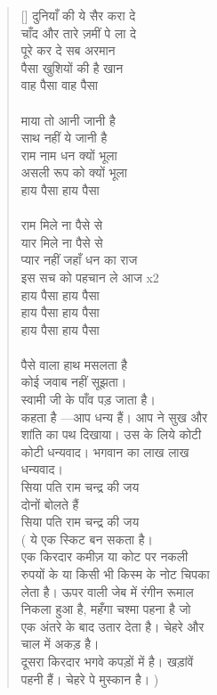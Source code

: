 \begin{verse}[\versewidth]
{दुनियाँ की ये सैर करा दे\\
चाँद और तारे ज़मीं पे ला दे\\
पूरे कर दे सब अरमान\\
पैसा खुशियों की है खान\\
वाह पैसा वाह पैसा\\
\\
माया तो आनी जानी है\\
साथ नहीं ये जानी है\\
राम नाम धन क्यों भूला\\
असली रूप को क्यों भूला\\
हाय पैसा हाय पैसा\\
\\
राम मिले ना पैसे से\\
यार मिले ना पैसे से\\
प्यार नहीं जहाँ धन का राज\\
इस सच को पहचान ले आज x2\\
हाय पैसा हाय पैसा\\
हाय पैसा हाय पैसा\\
हाय पैसा हाय पैसा\\
\\
पैसे वाला हाथ मसलता है\\
कोई जवाब नहीं सूझता।\\
स्वामी जी के पाँव पड़ जाता है।\\
कहता है —आप धन्य हैं। आप ने सुख और\\
शांति का पथ दिखाया। उस के लिये कोटी\\
कोटी धन्यवाद। भगवान का लाख लाख\\
धन्यवाद।\\
सिया पति राम चन्द्र की जय\\
दोनों बोलते हैं\\
सिया पति राम चन्द्र की जय\\
( ये एक स्किट बन सकता है।\\
एक किरदार कमीज़ या कोट पर नकली\\
रुपयों के या किसी भी किस्म के नोट चिपका\\
लेता है। ऊपर वाली जेब में रंगीन रूमाल\\
निकला हुआ है, महँगा चश्मा पहना है जो\\
एक अंतरे के बाद उतार देता है। चेहरे और\\
चाल में अकड़ है।\\
दूसरा किरदार भगवे कपड़ों में है। खड़ांवें\\
पहनी हैं। चेहरे पे मुस्कान है।
)
}\end{verse}

